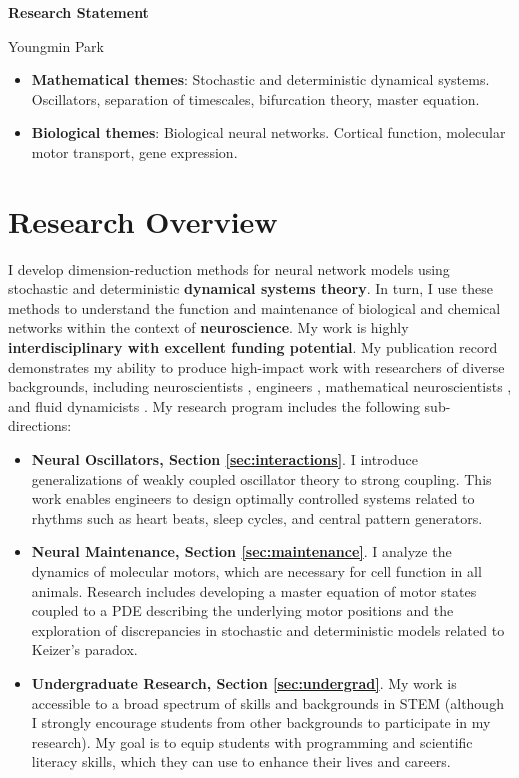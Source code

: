 \documentclass[a4paper,11pt]{article}
\begin{document}
	
	\begin{center}
		\Large \textbf{Research Statement}
		
		\Large Youngmin Park
	\end{center}
	
	\begin{itemize}
		\item \textbf{Mathematical themes}: Stochastic and deterministic dynamical systems. Oscillators, separation of timescales, bifurcation theory, master equation.
		\item\textbf{Biological themes}: Biological neural networks. Cortical function, molecular motor transport, gene expression.
	\end{itemize}
	
	\section{Research Overview}
	
	I develop dimension-reduction methods for neural network models using stochastic and deterministic \textbf{dynamical systems theory}. In turn, I use these methods to understand the function and maintenance of biological and chemical networks within the context of \textbf{neuroscience}. My work is highly \textbf{interdisciplinary with excellent funding potential}. My publication record demonstrates my ability to produce high-impact work with researchers of diverse backgrounds, including neuroscientists \cite{park2020circuit,shaw2012phase}, engineers \cite{ermentrout2019recent,park2021high}, mathematical neuroscientists \cite{park2016weakly,park2018infinitesimal,park2018multiple,park2018scalar}, and fluid dynamicists \cite{park2020dynamics,park2021coarse,fai2020global}. My research program includes the following sub-directions:
	
	\begin{itemize}
		\item \textbf{Neural Oscillators, Section \ref{sec:interactions}}. I introduce generalizations of weakly coupled oscillator theory to strong coupling. This work enables engineers to design optimally controlled systems related to rhythms such as heart beats, sleep cycles, and central pattern generators.
		\item \textbf{Neural Maintenance, Section \ref{sec:maintenance}}. I analyze the dynamics of molecular motors, which are necessary for cell function in all animals. Research includes developing a master equation of motor states coupled to a PDE describing the underlying motor positions and the exploration of discrepancies in stochastic and deterministic models related to Keizer's paradox.
		\item \textbf{Undergraduate Research, Section \ref{sec:undergrad}}. My work is accessible to a broad spectrum of skills and backgrounds in STEM (although I strongly encourage students from other backgrounds to participate in my research). My goal is to equip students with programming and scientific literacy skills, which they can use to enhance their lives and careers.
	\end{itemize}
	
\end{document}
